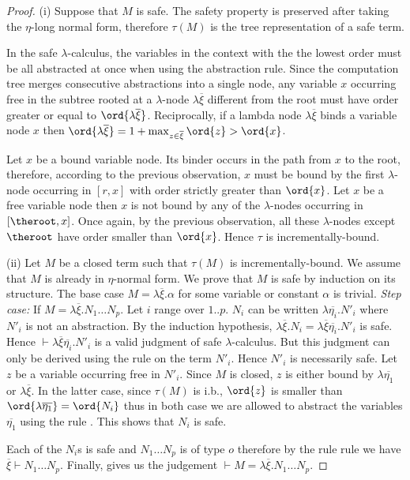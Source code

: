 \begin{proof}
(i) Suppose that $M$ is safe. The safety property is preserved after
taking the $\eta$-long normal form, therefore $\tau(M)$ is the tree
representation of a safe term.

In the safe $\lambda$-calculus, the variables in the context with
the the lowest order must be all abstracted at once when using the
abstraction rule. Since the computation tree merges consecutive
abstractions into a single node, any variable $x$ occurring free in
the subtree rooted at a $\lambda$-node $\lambda \overline{\xi}$
different from the root must have order greater or equal to
$\ord{\lambda \overline{\xi}}$. Reciprocally, if a lambda node
$\lambda \overline{\xi}$ binds a variable node $x$ then
$\ord{\lambda \overline{\xi}} = 1+\max_{z\in\overline{\xi}} \ord{z}
> \ord{x}$.

Let $x$ be a bound variable node. Its binder occurs in the path from
$x$ to the root, therefore, according to the previous observation,
$x$ must be bound by the first $\lambda$-node occurring in $[r,x]$
with order strictly greater than $\ord{x}$. Let $x$ be a free
variable node then $x$ is not bound by any of the $\lambda$-nodes
occurring in $[\theroot,x]$. Once again, by the previous
observation, all these $\lambda$-nodes except $\theroot$ have order
smaller than $\ord{x}$. Hence $\tau$ is incrementally-bound.

(ii) Let $M$ be a closed term such that $\tau(M)$ is
incrementally-bound. We assume that $M$ is already in $\eta$-normal
form. We prove that $M$ is safe by induction on its structure. The
base case $M = \lambda \overline{\xi} . \alpha$ for some variable or
constant $\alpha$ is trivial. \emph{Step case:} If $M = \lambda
\overline{\xi} . N_1 \ldots N_p$. Let $i$ range over $1..p$. $N_i$
can be written $\lambda \overline{\eta_i} . N'_i$ where $N'_i$ is
not an abstraction. By the induction hypothesis, $\lambda
\overline{\xi} . N_i = \lambda \overline{\xi} \overline{\eta_i} .
N'_i$ is safe. Hence $\vdash \lambda \overline{\xi}
\overline{\eta_i} . N'_i$ is a valid judgment of safe
$\lambda$-calculus. But this judgment can only be derived using the
 rule on the term $N'_i$. Hence $N'_i$ is necessarily
safe. Let $z$ be a variable occurring free in $N'_i$. Since $M$ is
closed, $z$ is either bound by $\lambda \overline{\eta_1}$ or
$\lambda \overline{\xi}$. In the latter case, since $\tau(M)$ is
i.b., $\ord{z}$ is smaller than $\ord{\lambda
\overline{\eta_1}}=\ord{N_i}$ thus in both case we are allowed to
abstract the variables $\overline{\eta_1}$ using the rule
. This shows that $N_i$ is safe.

Each of the $N_i$s is safe and $N_1 \ldots N_p$ is of type $o$
therefore by the rule  rule we have $\overline{\xi}
\vdash N_1 \ldots N_p$. Finally,  gives us the
judgement $\vdash M = \lambda \overline{\xi} . N_1 \ldots N_p$.
\end{proof}


